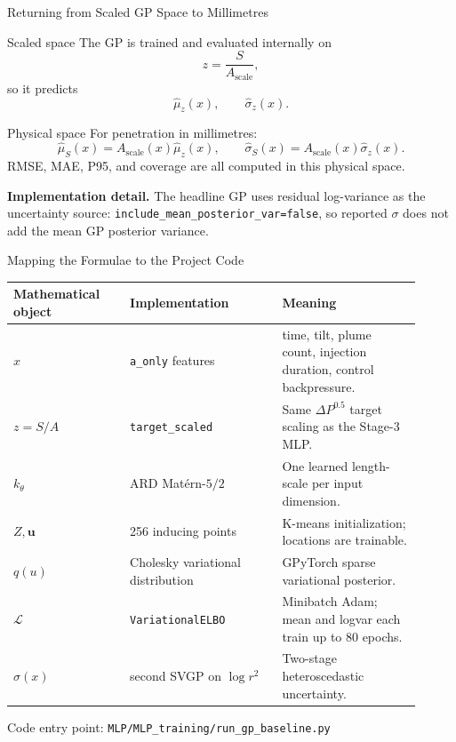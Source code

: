 \documentclass[UTF8,aspectratio=169]{ctexbeamer}
\begin{document}
\begin{frame}{Returning from Scaled GP Space to Millimetres}
\footnotesize
\begin{block}{Scaled space}
\scriptsize
The GP is trained and evaluated internally on
\[
z=\frac{S}{A_{\mathrm{scale}}},
\]
so it predicts
\[
\hat\mu_z(x),\qquad \hat\sigma_z(x).
\]
\end{block}

\begin{block}{Physical space}
\scriptsize
For penetration in millimetres:
\[
\hat\mu_S(x)=A_{\mathrm{scale}}(x)\hat\mu_z(x),
\qquad
\hat\sigma_S(x)=A_{\mathrm{scale}}(x)\hat\sigma_z(x).
\]
RMSE, MAE, P95, and coverage are all computed in this physical space.
\end{block}

\vspace{-0.2em}
\scriptsize
\textbf{Implementation detail.}
The headline GP uses residual log-variance as the uncertainty source:
\texttt{include\_mean\_posterior\_var=false}, so reported \(\sigma\) does not
add the mean GP posterior variance.
\end{frame}

\begin{frame}{Mapping the Formulae to the Project Code}
\scriptsize
\begin{tabular}{L{0.26\linewidth}L{0.34\linewidth}L{0.31\linewidth}}
\toprule
Mathematical object & Implementation & Meaning \\
\midrule
\(x\) &
\texttt{a\_only} features &
time, tilt, plume count, injection duration, control backpressure. \\
\(z=S/A\) &
\texttt{target\_scaled} &
Same \(\Delta P^{0.5}\) target scaling as the Stage-3 MLP. \\
\(k_\theta\) &
ARD Matérn-\(5/2\) &
One learned length-scale per input dimension. \\
\(Z,\mathbf u\) &
256 inducing points &
K-means initialization; locations are trainable. \\
\(q(u)\) &
Cholesky variational distribution &
GPyTorch sparse variational posterior. \\
\(\mathcal L\) &
\texttt{VariationalELBO} &
Minibatch Adam; mean and logvar each train up to 80 epochs. \\
\(\sigma(x)\) &
second SVGP on \(\log r^2\) &
Two-stage heteroscedastic uncertainty. \\
\bottomrule
\end{tabular}

\vspace{0.5em}
\footnotesize
Code entry point: \texttt{MLP/MLP\_training/run\_gp\_baseline.py}
\end{frame}
\end{document}
